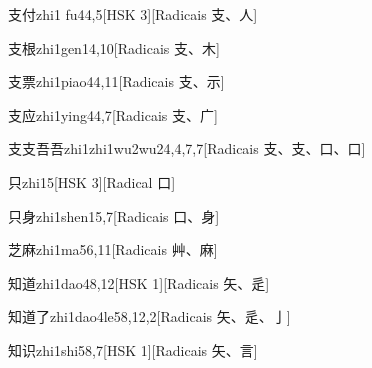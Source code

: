 \begin{entry}{支付}{zhi1 fu4}{4,5}[HSK 3][Radicais ⽀、⼈]
\end{entry}

\begin{entry}{支根}{zhi1gen1}{4,10}[Radicais ⽀、⽊]
\end{entry}

\begin{entry}{支票}{zhi1piao4}{4,11}[Radicais ⽀、⽰]
\end{entry}

\begin{entry}{支应}{zhi1ying4}{4,7}[Radicais ⽀、⼴]
\end{entry}

\begin{entry}{支支吾吾}{zhi1zhi1wu2wu2}{4,4,7,7}[Radicais ⽀、⽀、⼝、⼝]
\end{entry}

\begin{entry}{只}{zhi1}{5}[HSK 3][Radical ⼝]
\end{entry}

\begin{entry}{只身}{zhi1shen1}{5,7}[Radicais ⼝、⾝]
\end{entry}

\begin{entry}{芝麻}{zhi1ma5}{6,11}[Radicais ⾋、⿇]
\end{entry}

\begin{entry}{知道}{zhi1dao4}{8,12}[HSK 1][Radicais ⽮、⾡]
\end{entry}

\begin{entry}{知道了}{zhi1dao4le5}{8,12,2}[Radicais ⽮、⾡、⼅]
\end{entry}

\begin{entry}{知识}{zhi1shi5}{8,7}[HSK 1][Radicais ⽮、⾔]
\end{entry}

